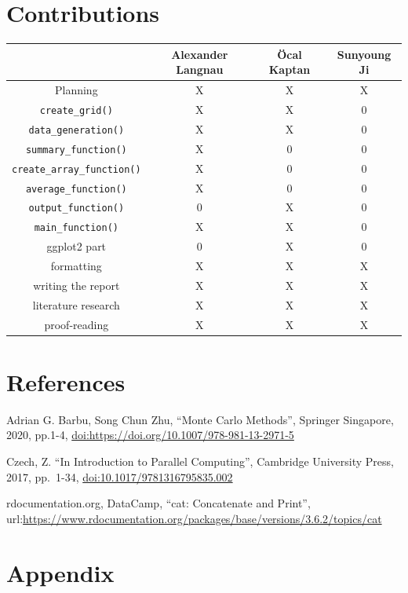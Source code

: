 \documentclass[11pt,a4paper]{article}
\begin{document}
\pagebreak

\hypertarget{contributions}{%
\section{Contributions}\label{contributions}}

\begin{longtable}[]{@{}cccc@{}}
\toprule()
& Alexander Langnau & Öcal Kaptan & Sunyoung Ji \\
\midrule()
\endhead
Planning & X & X & X \\
\texttt{create\_grid()} & X & X & 0 \\
\texttt{data\_generation()} & X & X & 0 \\
\texttt{summary\_function()} & X & 0 & 0 \\
\texttt{create\_array\_function()} & X & 0 & 0 \\
\texttt{average\_function()} & X & 0 & 0 \\
\texttt{output\_function()} & 0 & X & 0 \\
\texttt{main\_function()} & X & X & 0 \\
ggplot2 part & 0 & X & 0 \\
formatting & X & X & X \\
writing the report & X & X & X \\
literature research & X & X & X \\
proof-reading & X & X & X \\
\bottomrule()
\end{longtable}

\pagebreak

\hypertarget{references}{%
\section{References}\label{references}}

Adrian G. Barbu, Song Chun Zhu, ``Monte Carlo Methods'', Springer
Singapore, 2020, pp.1-4,
\url{doi:https://doi.org/10.1007/978-981-13-2971-5}

Czech, Z. ``In Introduction to Parallel Computing'', Cambridge
University Press, 2017, pp.~1-34, \url{doi:10.1017/9781316795835.002}

rdocumentation.org, DataCamp, ``cat: Concatenate and Print'',
url:\url{https://www.rdocumentation.org/packages/base/versions/3.6.2/topics/cat}

\pagebreak

\hypertarget{appendix}{%
\section{Appendix}\label{appendix}}
\end{document}
